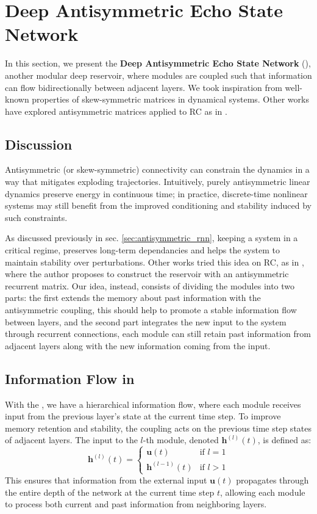 \section{Deep Antisymmetric Echo State Network}
\label{sec:method:antisymmetric}
In this section, we present the \textbf{Deep Antisymmetric Echo State Network} (\DAR), another modular deep reservoir,
where modules are coupled such that information can flow bidirectionally between adjacent layers. We took inspiration from well-known properties of
skew-symmetric matrices in dynamical systems. Other works have explored antisymmetric matrices applied to RC as in \cite{kozachkov2022rnns}.
\subsection{Discussion}
Antisymmetric (or skew-symmetric) connectivity can constrain the dynamics in a way that mitigates exploding trajectories.
Intuitively, purely antisymmetric linear dynamics preserve energy in continuous time; in practice, 
discrete-time nonlinear systems may still benefit from the improved conditioning and stability induced by such constraints.

As discussed previously in sec. \ref{sec:antisymmetric_rnn}, keeping a system in a critical regime, preserves long-term dependancies 
and helps the system to maintain stability over perturbations. Other works tried this idea on RC, as in \cite{gallicchio2024euler}, where the author
proposes to construct the reservoir with an antisymmetric recurrent matrix.
\newline
Our idea, instead, consists of dividing the modules into two parts: the first extends the memory about past information with the antisymmetric coupling,
this should help to promote a stable information flow between layers, and the second part integrates the new input to the system through recurrent connections, each module can still retain past
information from adjacent layers along with the new information coming from the input.

\subsection{Information Flow in \DAR}
With the \DAR, we have a hierarchical information flow, where each module receives input from the previous layer's state at the current time step.
To improve memory retention and stability, the coupling acts on the previous time step states of adjacent layers.
The input to the $l$-th module, denoted $\mathbf{h}^{(l)}(t)$, is defined as:
\begin{equation}
    \mathbf{h}^{(l)}(t) = 
    \begin{cases} 
        \mathbf{u}(t) & \text{if } l = 1 \\
        \mathbf{h}^{(l-1)}(t) & \text{if } l > 1 
    \end{cases}
\end{equation}
This ensures that information from the external input $\mathbf{u}(t)$ propagates through the entire depth of the network at the current time step $t$, 
allowing each module to process both current and past information from neighboring layers.
